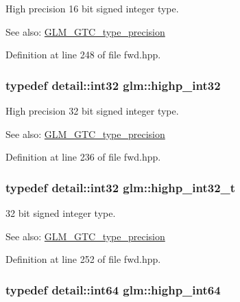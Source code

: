 High precision 16 bit signed integer type. \begin{Desc}
\item[See also:]\hyperlink{group__gtc__type__precision}{GLM\_\-GTC\_\-type\_\-precision} \end{Desc}


Definition at line 248 of file fwd.hpp.\hypertarget{group__gtc__type__precision_ga2045c92b9553d463191af6a20e997bb}{
\subsubsection[highp\_\-int32]{\setlength{\rightskip}{0pt plus 5cm}typedef detail::int32 {\bf glm::highp\_\-int32}}}
\label{group__gtc__type__precision_ga2045c92b9553d463191af6a20e997bb}


High precision 32 bit signed integer type. \begin{Desc}
\item[See also:]\hyperlink{group__gtc__type__precision}{GLM\_\-GTC\_\-type\_\-precision} \end{Desc}


Definition at line 236 of file fwd.hpp.\hypertarget{group__gtc__type__precision_g783d077a513c1f475f6cdb406b4238c3}{
\subsubsection[highp\_\-int32\_\-t]{\setlength{\rightskip}{0pt plus 5cm}typedef detail::int32 {\bf glm::highp\_\-int32\_\-t}}}
\label{group__gtc__type__precision_g783d077a513c1f475f6cdb406b4238c3}


32 bit signed integer type. \begin{Desc}
\item[See also:]\hyperlink{group__gtc__type__precision}{GLM\_\-GTC\_\-type\_\-precision} \end{Desc}


Definition at line 252 of file fwd.hpp.\hypertarget{group__gtc__type__precision_g7ffb27943e9569800979081bc548621c}{
\subsubsection[highp\_\-int64]{\setlength{\rightskip}{0pt plus 5cm}typedef detail::int64 {\bf glm::highp\_\-int64}}}
\label{group__gtc__type__precision_g7ffb27943e9569800979081bc548621c}


